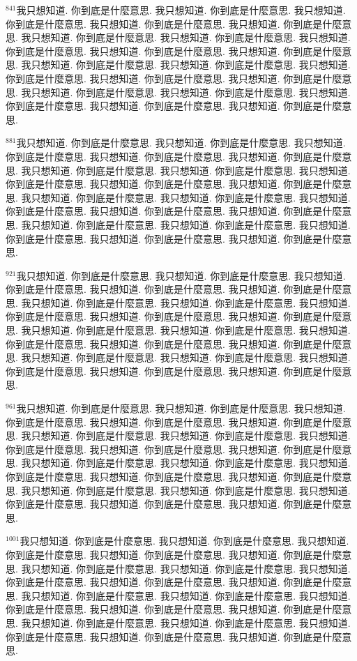 \documentclass{book}
\begin{document}
$^{841}$我只想知道.
你到底是什麼意思.
我只想知道.
你到底是什麼意思.
我只想知道.
你到底是什麼意思.
我只想知道.
你到底是什麼意思.
我只想知道.
你到底是什麼意思.
我只想知道.
你到底是什麼意思.
我只想知道.
你到底是什麼意思.
我只想知道.
你到底是什麼意思.
我只想知道.
你到底是什麼意思.
我只想知道.
你到底是什麼意思.
我只想知道.
你到底是什麼意思.
我只想知道.
你到底是什麼意思.
我只想知道.
你到底是什麼意思.
我只想知道.
你到底是什麼意思.
我只想知道.
你到底是什麼意思.
我只想知道.
你到底是什麼意思.
我只想知道.
你到底是什麼意思.
我只想知道.
你到底是什麼意思.
我只想知道.
你到底是什麼意思.
我只想知道.
你到底是什麼意思.

$^{881}$我只想知道.
你到底是什麼意思.
我只想知道.
你到底是什麼意思.
我只想知道.
你到底是什麼意思.
我只想知道.
你到底是什麼意思.
我只想知道.
你到底是什麼意思.
我只想知道.
你到底是什麼意思.
我只想知道.
你到底是什麼意思.
我只想知道.
你到底是什麼意思.
我只想知道.
你到底是什麼意思.
我只想知道.
你到底是什麼意思.
我只想知道.
你到底是什麼意思.
我只想知道.
你到底是什麼意思.
我只想知道.
你到底是什麼意思.
我只想知道.
你到底是什麼意思.
我只想知道.
你到底是什麼意思.
我只想知道.
你到底是什麼意思.
我只想知道.
你到底是什麼意思.
我只想知道.
你到底是什麼意思.
我只想知道.
你到底是什麼意思.
我只想知道.
你到底是什麼意思.

$^{921}$我只想知道.
你到底是什麼意思.
我只想知道.
你到底是什麼意思.
我只想知道.
你到底是什麼意思.
我只想知道.
你到底是什麼意思.
我只想知道.
你到底是什麼意思.
我只想知道.
你到底是什麼意思.
我只想知道.
你到底是什麼意思.
我只想知道.
你到底是什麼意思.
我只想知道.
你到底是什麼意思.
我只想知道.
你到底是什麼意思.
我只想知道.
你到底是什麼意思.
我只想知道.
你到底是什麼意思.
我只想知道.
你到底是什麼意思.
我只想知道.
你到底是什麼意思.
我只想知道.
你到底是什麼意思.
我只想知道.
你到底是什麼意思.
我只想知道.
你到底是什麼意思.
我只想知道.
你到底是什麼意思.
我只想知道.
你到底是什麼意思.
我只想知道.
你到底是什麼意思.

$^{961}$我只想知道.
你到底是什麼意思.
我只想知道.
你到底是什麼意思.
我只想知道.
你到底是什麼意思.
我只想知道.
你到底是什麼意思.
我只想知道.
你到底是什麼意思.
我只想知道.
你到底是什麼意思.
我只想知道.
你到底是什麼意思.
我只想知道.
你到底是什麼意思.
我只想知道.
你到底是什麼意思.
我只想知道.
你到底是什麼意思.
我只想知道.
你到底是什麼意思.
我只想知道.
你到底是什麼意思.
我只想知道.
你到底是什麼意思.
我只想知道.
你到底是什麼意思.
我只想知道.
你到底是什麼意思.
我只想知道.
你到底是什麼意思.
我只想知道.
你到底是什麼意思.
我只想知道.
你到底是什麼意思.
我只想知道.
你到底是什麼意思.
我只想知道.
你到底是什麼意思.

$^{1001}$我只想知道.
你到底是什麼意思.
我只想知道.
你到底是什麼意思.
我只想知道.
你到底是什麼意思.
我只想知道.
你到底是什麼意思.
我只想知道.
你到底是什麼意思.
我只想知道.
你到底是什麼意思.
我只想知道.
你到底是什麼意思.
我只想知道.
你到底是什麼意思.
我只想知道.
你到底是什麼意思.
我只想知道.
你到底是什麼意思.
我只想知道.
你到底是什麼意思.
我只想知道.
你到底是什麼意思.
我只想知道.
你到底是什麼意思.
我只想知道.
你到底是什麼意思.
我只想知道.
你到底是什麼意思.
我只想知道.
你到底是什麼意思.
我只想知道.
你到底是什麼意思.
我只想知道.
你到底是什麼意思.
我只想知道.
你到底是什麼意思.
我只想知道.
你到底是什麼意思.
\end{document}
